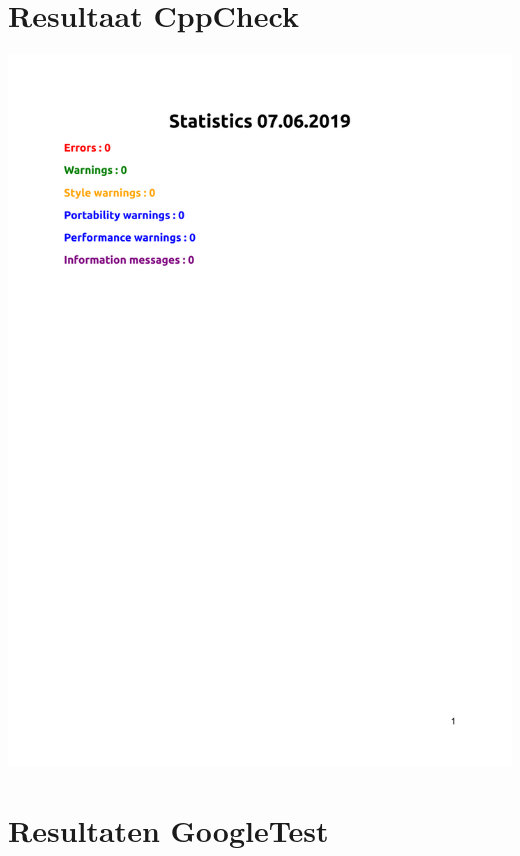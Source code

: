 \documentclass[a4paper, 11pt, oneside]{report}
\begin{document}
\chapter{Resultaat CppCheck}\label{sec:resultaat-cppcheck}
\begin{center}\includegraphics[page=1,width=.8\linewidth]{Bijlagen/cppcheck-gui.pdf}\end{center}

\chapter{Resultaten GoogleTest}\label{sec:resultaten-googletest}
\end{document}
